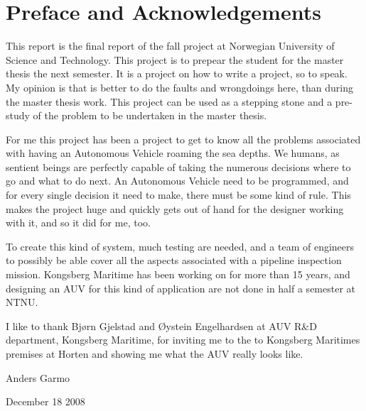 \chapter{Preface and Acknowledgements}
	This report is the final report of the fall project at Norwegian University of Science and Technology.
	This project is to prepear the student for the master thesis the next semester. It is a
	project on how to write a project, so to speak. My opinion is that is better to do the faults and wrongdoings
	here, than during the master thesis work. This project can be used as a stepping stone and a pre-study of
	the problem to be undertaken in the master thesis.

	For me this project has been a project to get to know all the problems associated with having an 
	Autonomous Vehicle roaming the sea depths. We humans, as sentient beings are perfectly capable 
	of taking the numerous decisions where
	to go and what to do next. An Autonomous Vehicle need to be programmed, and for every single
	decision it need to make, there must be some kind of rule. This makes the project huge and quickly gets 
	out of hand for the designer working with it, and so it did for me, too.

	To create this kind of system, much testing are needed, and a team of engineers to possibly be able cover all
	the aspects associated with a pipeline inspection mission. Kongsberg Maritime has been working on \hugin for
	more than 15 years, and designing an AUV for this kind of application are not done in half a semester
	at NTNU. 
	
	I like to thank Bjørn Gjelstad and Øystein Engelhardsen at AUV R\&D department, Kongsberg Maritime, for 
	inviting me to the to Kongsberg Maritimes premises at Horten and showing me what the \hugin AUV really looks
	like.

	\hfill
	
	Anders Garmo 
	
	December 18 2008
	
	


